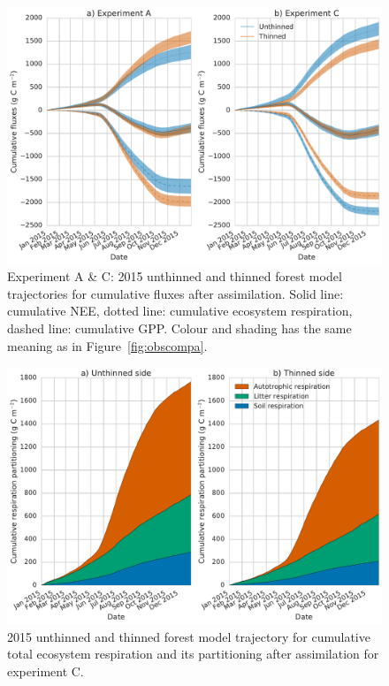 \documentclass[draft,linenumbers]{agujournal}
\begin{document}
\begin{figure}[ht]
    \centering
        \includegraphics[width=\textwidth]{flux_part.pdf}
    \caption{Experiment A \& C: 2015 unthinned and thinned forest model trajectories for cumulative fluxes after assimilation. Solid line: cumulative NEE, dotted line: cumulative ecosystem respiration, dashed line: cumulative GPP. Colour and shading has the same meaning as in Figure~\ref{fig:obscompa}.} \label{fig:cum_flux}
\end{figure}


\begin{figure}[ht]
    \centering
        \includegraphics[width=\textwidth]{resp_partc.pdf}
    \caption{2015 unthinned and thinned forest model trajectory for cumulative total ecosystem respiration and its partitioning after assimilation for experiment C.} \label{fig:rt_part}
\end{figure}
\end{document}
